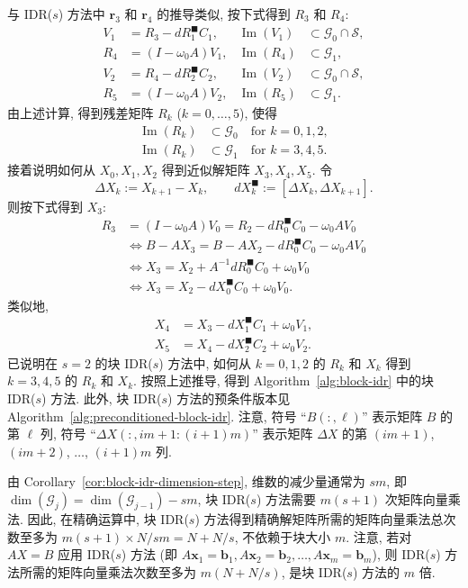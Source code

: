 {与 IDR($s$) 方法中 $\bm r_3$ 和 $\bm r_4$ 的推导类似, 按下式得到 $R_3$ 和 $R_4$:}
\[\begin{aligned}V_1&=R_3-dR_1^{\blacksquare}C_1,&\operatorname{Im}(V_1)&\subset\mathcal G_0\cap\mathcal S,\\R_4&=(I-\omega_0A)V_1,&\operatorname{Im}(R_4)&\subset\mathcal G_1,\\V_2&=R_4-dR_2^{\blacksquare}C_2,&\operatorname{Im}(V_2)&\subset\mathcal G_0\cap\mathcal S,\\R_5&=(I-\omega_0A)V_2,&\operatorname{Im}(R_5)&\subset\mathcal G_1.\end{aligned}\]
{由上述计算, 得到残差矩阵 $R_k$ ($k=0,\ldots,5$), 使得}
\[\begin{aligned}\operatorname{Im}(R_k)&\subset\mathcal G_0\quad\text{for }k=0,1,2,\\\operatorname{Im}(R_k)&\subset\mathcal G_1\quad\text{for }k=3,4,5.\end{aligned}\]
{接着说明如何从 $X_0,X_1,X_2$ 得到近似解矩阵 $X_3,X_4,X_5$. 令}
\[\Delta X_k:=X_{k+1}-X_k,\qquad dX_k^{\blacksquare}:=[\Delta X_k,\Delta X_{k+1}].\]
{则按下式得到 $X_3$:}
\[\begin{aligned}R_3&=(I-\omega_0A)V_0=R_2-dR_0^{\blacksquare}C_0-\omega_0AV_0\\&\Leftrightarrow B-AX_3=B-AX_2-dR_0^{\blacksquare}C_0-\omega_0AV_0\\&\Leftrightarrow X_3=X_2+A^{-1}dR_0^{\blacksquare}C_0+\omega_0V_0\\&\Leftrightarrow X_3=X_2-dX_0^{\blacksquare}C_0+\omega_0V_0.\end{aligned}\]
{类似地,}
\[\begin{aligned}X_4&=X_3-dX_1^{\blacksquare}C_1+\omega_0V_1,\\X_5&=X_4-dX_2^{\blacksquare}C_2+\omega_0V_2.\end{aligned}\]
{已说明在 $s=2$ 的块 IDR($s$) 方法中, 如何从 $k=0,1,2$ 的 $R_k$ 和 $X_k$ 得到 $k=3,4,5$ 的 $R_k$ 和 $X_k$. 按照上述推导, 得到 Algorithm\ \ref{alg:block-idr} 中的块 IDR($s$) 方法. 此外, 块 IDR($s$) 方法的预条件版本见 Algorithm\ \ref{alg:preconditioned-block-idr}. 注意, 符号 ``$B(:,\ell)$'' 表示矩阵 $B$ 的第 $\ell$ 列, 符号 ``$\Delta X(:,im+1:(i+1)m)$'' 表示矩阵 $\Delta X$ 的第 $(im+1)$, $(im+2)$, $\ldots$, $(i+1)m$ 列.}
\par{}
\begin{Remark}\label{rem:block-idr-matvec-bound}
{由 Corollary\ \ref{cor:block-idr-dimension-step}, 维数的减少量通常为 $sm$, 即 $\dim(\mathcal G_j)=\dim(\mathcal G_{j-1})-sm$, 块 IDR($s$) 方法需要 $m(s+1)$ 次矩阵向量乘法. 因此, 在精确运算中, 块 IDR($s$) 方法得到精确解矩阵所需的矩阵向量乘法总次数至多为 $m(s+1)\times N/sm=N+N/s$, 不依赖于块大小 $m$. 注意, 若对 $AX=B$ 应用 IDR($s$) 方法 (即 $A\bm x_1=\bm b_1,A\bm x_2=\bm b_2,\ldots,A\bm x_m=\bm b_m$), 则 IDR($s$) 方法所需的矩阵向量乘法次数至多为 $m(N+N/s)$, 是块 IDR($s$) 方法的 $m$ 倍.}
\end{Remark}
